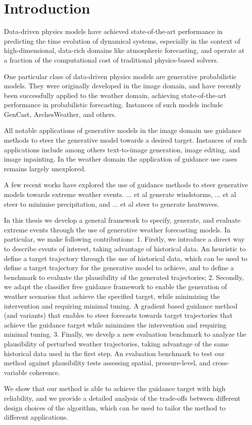\chapter{Introduction}


Data-driven physics models have achieved state-of-the-art performance in predicting the time evolution of
dynamical systems, especially in the context of high-dimensional, data-rich domains like atmospheric
forecasting, and operate at a fraction of the computational cost of traditional physics-based solvers.

One particular class of data-driven physics models are generative probabilistic models.
They were originally developed in the image domain, and have recently been successfully applied to the weather domain, achieving state-of-the-art performance in probabilistic forecasting.
Instances of such models include GenCast, ArchesWeather, and others.

All notable applications of generative models in the image domain use guidance methods to steer the generative model towards a desired target.
Instances of such applications include among others text-to-image generation, image editing, and image inpainting.
In the weather domain the application of guidance use cases remains largely unexplored. 

A few recent works have explored the use of guidance methods to steer generative models towards extreme weather events.
... et al generate windstorms, ... et al steer to minimise precipitation, and ... et al steer to generate heatwaves.

In this thesis we develop a general framework to specify, generate, and evaluate extreme events through the use of generative weather forecasting models.
In particular, we make following contributions:
1. Firstly, we introduce a direct way to describe events of interest, taking advantage of historical data. 
An heuristic to define a target trajectory through the use of historical data, which can be used to define a target trajectory for the generative model to achieve, and to define a benchmark to evaluate the plausibility of the generated trajectories;
2. Secondly, we adapt the classifier free guidance framework to enable the generation of weather scenarios that achieve the specified target, while minimizing the intervention and requiring minimal tuning.
A gradient based guidance method (and variants) that enables to steer forecasts towards target trajectories that achieve the guidance target while minimizes the intervention and requiring minimal tuning.
3. Finally, we develp a new evaluation benchmark to analyze the plausibility of perturbed weather trajectories, taking advantage of the same historical data used in the first step.
An evaluation benchmark to test our method against plausibility tests assessing spatial, pressure-level, and cross-variable coherence.

We show that our method is able to achieve the guidance target with high reliability, and we provide a detailed analysis of the trade-offs between different design choices of the algorithm, which can be used to tailor the method to different applications.
